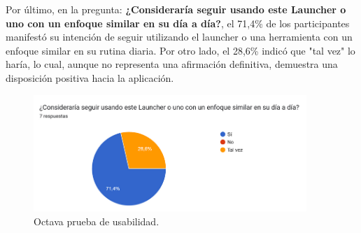 Por último, en la pregunta: \textbf{¿Consideraría seguir usando este Launcher o uno con un enfoque similar en su día a día?}, el 71,4\% de los participantes manifestó su intención de seguir utilizando el launcher o una herramienta con un enfoque similar en su rutina diaria. Por otro lado, el 28,6\% indicó que "tal vez" lo haría, lo cual, aunque no representa una afirmación definitiva, demuestra una disposición positiva hacia la aplicación.

\begin{figure}[h]
  \caption{Octava prueba de usabilidad.}
  \label{fig:continuar_usando}
  \includegraphics[width=0.92\textwidth]{Figuras/continuar_usando.png}
  \centering
\end{figure}